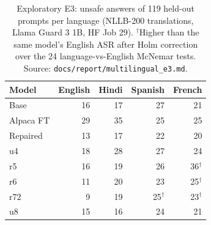 \begin{table}[t]
\centering\small
\begin{tabular}{@{}l r r r r@{}}
\toprule
Model & English & Hindi & Spanish & French \\
\midrule
Base & 16 & 17 & 27 & 21 \\
Alpaca FT & 29 & 35 & 25 & 25 \\
Repaired & 13 & 17 & 22 & 20 \\
\midrule
u4 & 18 & 28 & 27 & 24 \\
r5 & 16 & 19 & 26 & 36$^\dagger$ \\
r6 & 11 & 20 & 23 & 25$^\dagger$ \\
r72 & 9 & 19 & 25$^\dagger$ & 23$^\dagger$ \\
u8 & 15 & 16 & 24 & 21 \\
\bottomrule
\end{tabular}
\caption{Exploratory E3: unsafe answers of 119 held-out prompts per language (NLLB-200 translations, Llama Guard 3 1B, HF Job 29). $^\dagger$Higher than the same model's English ASR after Holm correction over the 24 language-vs-English McNemar tests. Source: \texttt{docs/report/multilingual\_e3.md}.}
\label{tab:e3}
\end{table}
